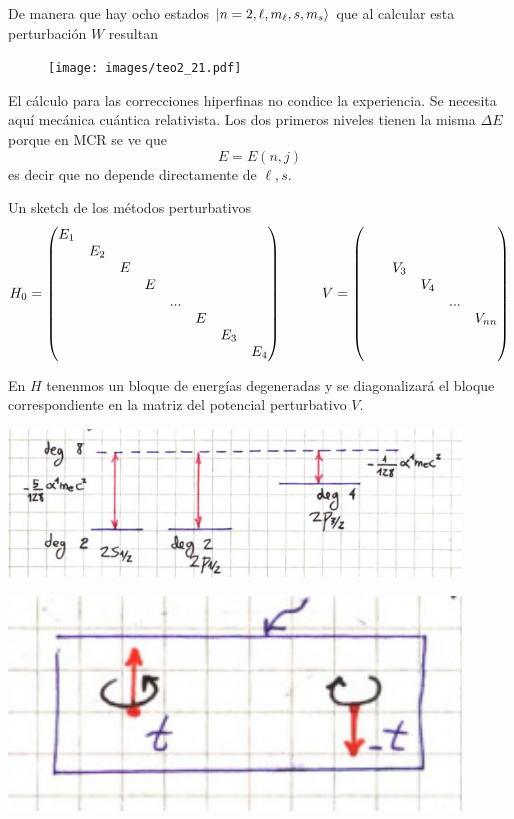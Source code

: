 \documentclass[10pt,oneside]{CBFT_book}
\begin{document}
De manera que hay ocho estados $\Ket{n=2,\ell,m_\ell,s,m_s}$ que al calcular esta perturbación $W$
resultan 
\begin{figure}[htb]
	\begin{center}
	\texttt{[image: images/teo2\_21.pdf]}
	\end{center}
	\caption{}
\end{figure} 

El cálculo para las correcciones hiperfinas no condice la experiencia. Se necesita aquí mecánica cuántica 
relativista. Los dos primeros niveles tienen la misma $\Delta E$ porque en MCR se ve que 
\[
	E = E(n,j) 
\]
es decir que no depende directamente de $\ell,s$.

Un sketch de los métodos perturbativos
\[
	H_0 = \begin{pmatrix}
	       E_1 & \\
	       & E_2 & \\
	       & & E \\
	       & & & E\\
	       & & & & ...\\
	       & & & & & E\\
	       & & & & & & E_3\\
	       & & & & & & & E_4
	      \end{pmatrix}
	      \hspace*{10mm}
	      V =
		\begin{pmatrix}
		& \\
		& \\
		& & V_3 \\
		& & & V_4 \\
		& & & & ... \\
		& & & & & V_{nn} \\
		& \\
		& 
		\end{pmatrix}
\]

En $H$ tenenmos un bloque de energías degeneradas y se diagonalizará el bloque 
correspondiente en la matriz del potencial perturbativo $V$.

\includegraphics[width=0.9\textwidth]{images/fig_ft2_atomo_hidrogeno.jpg}

\includegraphics[width=0.9\textwidth]{images/fig_ft2_extra_practica_desconocido.jpg}


\end{document}
